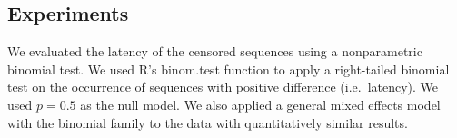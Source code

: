 \documentclass[12pt]{article}
\begin{document}
\subsection * {Experiments} \label{subsec:experiments}

%
%
%


We evaluated the latency of the censored sequences using a nonparametric binomial test.
We used R's binom.test function to apply a right-tailed binomial test on the occurrence of sequences with positive difference (i.e.~latency). We used $p=0.5$ as the null model.
We also applied a general mixed effects model with the binomial family to the data with quantitatively similar results.

\end{document}
